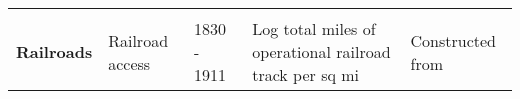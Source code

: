 \begin{tabular}{@{}l|llll@{}}
                                   &                                                             &                                    &             &                                                                                                                                                                                                   \\       
\textbf{Railroads} 	 & Railroad  access                                           & 1830 - 1911                         &  Log total miles of operational railroad track per sq mi     &  Constructed from \cite{atack2013use}      \\
  \hline\hline                                                                                                                               
\end{tabular}